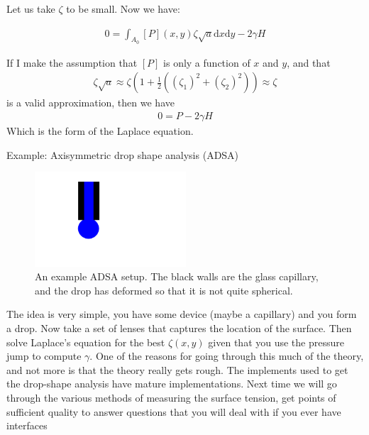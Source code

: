 \documentclass{article}
\renewcommand{\d}[0]{\mathrm{d}}
\begin{document}
\begin{section}{Let us take $\zeta$ to be small.}
		Now we have:

		\begin{align*}
			0 = \int_{A_0}[P](x,y) \zeta\sqrt{a}\d x\d y - 2\gamma H
		\end{align*}

		If I make the assumption that $[P]$ is only a function of $x$ and $y$, and that 
		\begin{align*}
			\zeta\sqrt{a} \approx \zeta(1 + \frac{1}{2}( (\zeta_1)^2 + (\zeta_2)^2))\approx \zeta
		\end{align*}
		is a valid approximation, then we have 
		\begin{align*}
			0 = P - 2\gamma H
		\end{align*}
		Which is the form of the Laplace equation.
  \end{section}
	\begin{section}{Example: Axisymmetric drop shape analysis (ADSA)}
		\begin{figure}[h]
			\centering
			\includegraphics[height=100pt]{ADSA}
			\caption{An example ADSA setup. The black walls are the glass capillary, and the drop has deformed so that it is not quite spherical. }
			\label{fig:ADSA}
		\end{figure}
  The idea is very simple, you have some device (maybe a capillary) and you form a drop. Now take a set of lenses that captures the location of the surface. Then solve Laplace's equation for the best $\zeta(x,y)$ given that you use the pressure jump to compute $\gamma$. One of the reasons for going through this much of the theory, and not more is that the theory really gets rough. The implements used to get the drop-shape analysis have mature implementations. Next time we will go through the various methods of measuring the surface tension, get points of sufficient quality to answer questions that you will deal with if you ever have interfaces 
\end{section}
\end{document}
